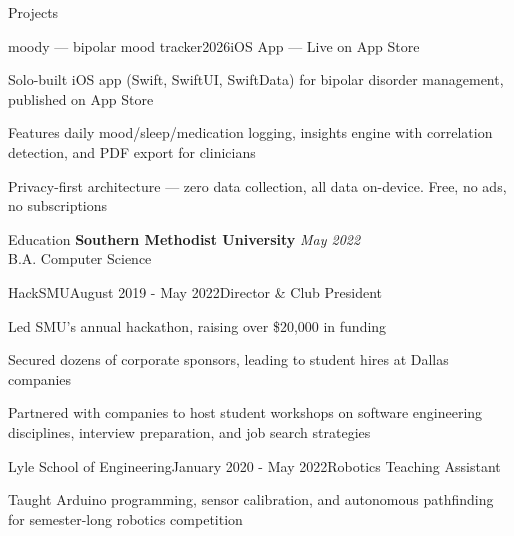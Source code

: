 \documentclass{resume} %
\begin{document}

\begin{rSection}{Projects}
    \begin{rSubsection}{moody --- bipolar mood tracker}{2026}{iOS App --- Live on App Store}{}
        \item Solo-built iOS app (Swift, SwiftUI, SwiftData) for bipolar disorder management, published on App Store
        \item Features daily mood/sleep/medication logging, insights engine with correlation detection, and PDF export for clinicians
        \item Privacy-first architecture --- zero data collection, all data on-device. Free, no ads, no subscriptions
    \end{rSubsection}
\end{rSection}


\begin{rSection}{Education}
    {\bf Southern Methodist University} \hfill {\em May 2022}
    \\ B.A. Computer Science

    \begin{rSubsection}{HackSMU}{August 2019 - May 2022}{Director \& Club President}{}
        \item Led SMU's annual hackathon, raising over \$20,000 in funding
        \item Secured dozens of corporate sponsors, leading to student hires at Dallas companies
        \item Partnered with companies to host student workshops on software engineering disciplines, interview preparation, and job search strategies
    \end{rSubsection}

    \begin{rSubsection}{Lyle School of Engineering}{January 2020 - May 2022}{Robotics Teaching Assistant}{}
        \item Taught Arduino programming, sensor calibration, and autonomous pathfinding for semester-long robotics competition
    \end{rSubsection}
\end{rSection}
\end{document}
